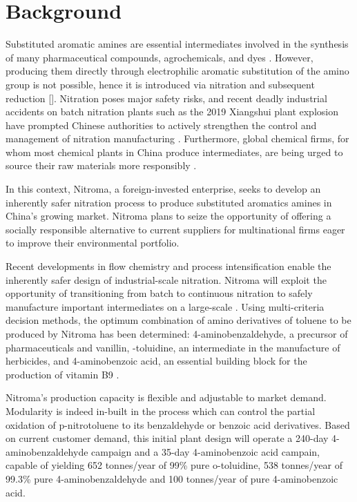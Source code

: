 \section*{Background}

Substituted aromatic amines are essential intermediates involved in the synthesis of many pharmaceutical compounds, agrochemicals, and dyes \cite{vogt_amines_2000}. However, producing them directly through electrophilic aromatic substitution of the amino group is not possible, hence it is introduced via nitration and subsequent reduction []. Nitration poses major safety risks, and recent deadly industrial accidents on batch nitration plants such as the 2019 Xiangshui plant explosion have prompted Chinese authorities to actively strengthen the control and management of nitration manufacturing \cite{el_diario_china_2019}. Furthermore, global chemical firms, for whom most chemical plants in China produce intermediates, are being urged to source their raw materials more responsibly \cite{stanway_global_2019}.

In this context, Nitroma, a foreign-invested enterprise, seeks to develop an inherently safer nitration process to produce substituted aromatics amines in China's growing market. Nitroma plans to seize the opportunity of offering a socially responsible alternative to current suppliers for multinational firms eager to improve their environmental portfolio. 

Recent developments in flow chemistry and process intensification enable the inherently safer design of industrial-scale nitration. Nitroma will exploit the opportunity of transitioning from batch to continuous nitration to safely manufacture important intermediates on a large-scale \cite{di_miceli_raimondi_safety_2015}. Using multi-criteria decision methods, the optimum combination of amino derivatives of toluene to be produced by Nitroma has been determined: 4-aminobenzaldehyde, a precursor of pharmaceuticals and vanillin, \ortho-toluidine, an intermediate in the manufacture of herbicides, and 4-aminobenzoic acid, an essential building block for the production of vitamin B9 \cite{bowers_toluidines_2000,bruhne_benzaldehyde_2011,maki_benzoic_2000}.

Nitroma's production capacity is flexible and adjustable to market demand. Modularity is indeed in-built in the process which can control the partial oxidation of p-nitrotoluene to its benzaldehyde or benzoic acid derivatives. Based on current customer demand, this initial plant design will operate a 240-day 4-aminobenzaldehyde campaign and a 35-day 4-aminobenzoic acid campain, capable of yielding 652 tonnes/year of 99\% pure o-toluidine, 538 tonnes/year of 99.3\% pure 4-aminobenzaldehyde and 100 tonnes/year of pure 4-aminobenzoic acid.

